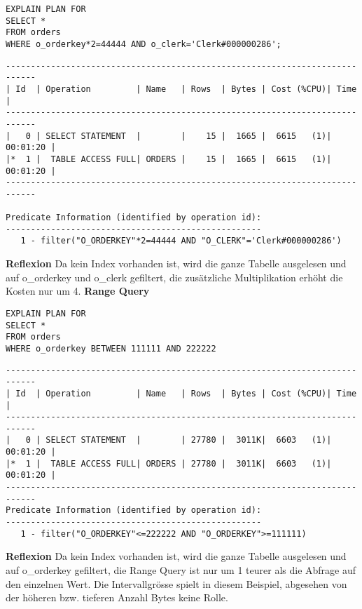 \documentclass[10pt]{article}
\begin{document}
\begin{lstlisting}[style=sql]
EXPLAIN PLAN FOR 
SELECT *
FROM orders
WHERE o_orderkey*2=44444 AND o_clerk='Clerk#000000286';
\end{lstlisting}
\begin{lstlisting}[style=queryexecutionplan]
----------------------------------------------------------------------------
| Id  | Operation         | Name   | Rows  | Bytes | Cost (%CPU)| Time     |
----------------------------------------------------------------------------
|   0 | SELECT STATEMENT  |        |    15 |  1665 |  6615   (1)| 00:01:20 |
|*  1 |  TABLE ACCESS FULL| ORDERS |    15 |  1665 |  6615   (1)| 00:01:20 |
----------------------------------------------------------------------------
 
Predicate Information (identified by operation id):
---------------------------------------------------
   1 - filter("O_ORDERKEY"*2=44444 AND "O_CLERK"='Clerk#000000286')
\end{lstlisting}
\textbf{Reflexion} \newline
Da kein Index vorhanden ist, wird die ganze Tabelle ausgelesen und auf o\_orderkey und o\_clerk gefiltert, die zusätzliche Multiplikation erhöht die Kosten nur um 4.
\newpage
\textbf{Range Query}
\begin{lstlisting}[style=sqlNoTitle]
EXPLAIN PLAN FOR
SELECT *
FROM orders
WHERE o_orderkey BETWEEN 111111 AND 222222
\end{lstlisting}
\begin{lstlisting}[style=queryexecutionplan]
----------------------------------------------------------------------------
| Id  | Operation         | Name   | Rows  | Bytes | Cost (%CPU)| Time     |
----------------------------------------------------------------------------
|   0 | SELECT STATEMENT  |        | 27780 |  3011K|  6603   (1)| 00:01:20 |
|*  1 |  TABLE ACCESS FULL| ORDERS | 27780 |  3011K|  6603   (1)| 00:01:20 |
----------------------------------------------------------------------------
Predicate Information (identified by operation id):
---------------------------------------------------
   1 - filter("O_ORDERKEY"<=222222 AND "O_ORDERKEY">=111111)
\end{lstlisting}
\textbf{Reflexion} \newline
Da kein Index vorhanden ist, wird die ganze Tabelle ausgelesen und auf o\_orderkey gefiltert, die Range Query ist nur um 1 teurer als die Abfrage auf den einzelnen Wert.
Die Intervallgrösse spielt in diesem Beispiel, abgesehen von der höheren bzw. tieferen Anzahl Bytes keine Rolle.
\end{document}
